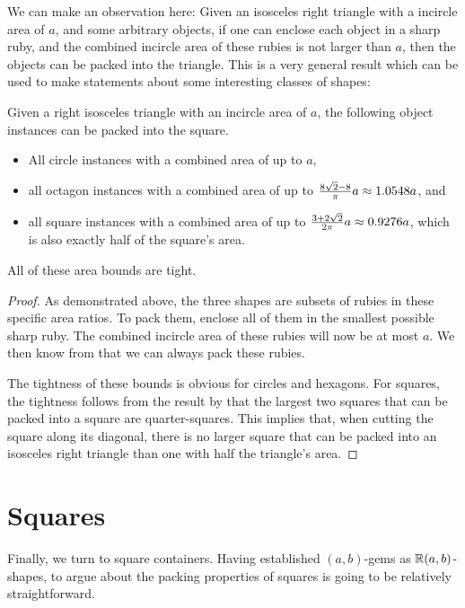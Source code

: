 \documentclass[a4paper,style=print,oneside,bibliography=totoc,nexus,lnum,extramargin]{tubsbook}
\begin{document}
We can make an observation here: Given an isosceles right triangle with a incircle area of $a$, and some arbitrary objects, if one can enclose each object in a sharp ruby, and the combined incircle area of these rubies is not larger than $a$, then the objects can be packed into the triangle. This is a very general result which can be used to make statements about some interesting classes of shapes:

\begin{corollary}\label{th:iso-right2}
    Given a right isosceles triangle with an incircle area of $a$, the following object instances can be packed into the square.

    \begin{itemize}
        \item All circle instances with a combined area of up to $a$,
        \item all octagon instances with a combined area of up to $\frac{8\sqrt{2}-8}{\pi}a \approx 1.0548a$, and
        \item all square instances with a combined area of up to $\frac{3+2\sqrt{2}}{2\pi}a \approx 0.9276a$, which is also exactly half of the square's area.
    \end{itemize}

    All of these area bounds are tight.
\end{corollary}

\begin{proof}
    As demonstrated above, the three shapes are subsets of rubies in these specific area ratios. To pack them, enclose all of them in the smallest possible sharp ruby. The combined incircle area of these rubies will now be at most $a$. We then know from  that we can always pack these rubies.

    The tightness of these bounds is obvious for circles and hexagons. For squares, the tightness follows from the result by \textcite{gobel1979geometrical} that the largest two squares that can be packed into a square are quarter-squares. This implies that, when cutting the square along its diagonal, there is no larger square that can be packed into an isosceles right triangle than one with half the triangle's area.
\end{proof}

\section{Squares}

Finally, we turn to square containers. Having established $(a,b)$-gems as $\mathbb{R}(a,b)$-shapes, to argue about the packing properties of squares is going to be relatively straightforward.
\end{document}

